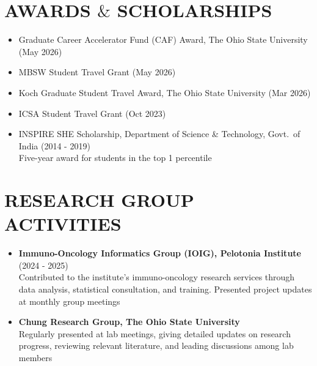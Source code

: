 \documentclass[11pt,a4paper,roman]{moderncv}        %
\begin{document}
\section{AWARDS $\&$ SCHOLARSHIPS}
\begin{itemize}
\vskip 0.1cm
    \item Graduate Career Accelerator Fund (CAF) Award, The Ohio State University (May 2026)
\vskip 0.1cm
    \item MBSW Student Travel Grant (May 2026)
\vskip 0.1cm
    \item Koch Graduate Student Travel Award, The Ohio State University (Mar 2026)
\vskip 0.1cm
    \item ICSA Student Travel Grant (Oct 2023)
\vskip 0.1cm
    \item INSPIRE SHE Scholarship, Department of Science \& Technology, Govt.\ of India (2014 - 2019) \\
    Five-year award for students in the top 1 percentile
 \end{itemize}

\section{RESEARCH GROUP ACTIVITIES}
\begin{itemize}
\vskip 0.1cm
\item \textbf{Immuno-Oncology Informatics Group (IOIG), Pelotonia Institute} (2024 - 2025)\\
Contributed to the institute's immuno-oncology research services through data analysis, statistical consultation, and training. Presented project updates at monthly group meetings
\vskip 0.1cm
\item \textbf{Chung Research Group, The Ohio State University}\\
Regularly presented at lab meetings, giving detailed updates on research progress, reviewing relevant literature, and leading discussions among lab members
\end{itemize}

\end{document}
